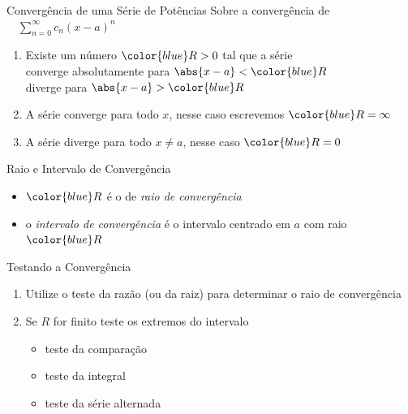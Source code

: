 \begin{frame}{Convergência de uma Série de Potências}
  Sobre a convergência de
  \(\quad\sum_{n=0}^\infty c_n(x-a)^n\quad\)

  \pause
  \vspace{\baselineskip}
  \begin{enumerate}[<+->]
    \item Existe um número ${\color{blue}R>0}$ tal que a série \\[1mm]
          \tabto{10mm} converge absolutamente para \tabto{70mm} \(\abs{x-a}<{\color{blue}R}\) \\
          \tabto{10mm} diverge para                \tabto{70mm} \(\abs{x-a}>{\color{blue}R}\)
    \vspace{\baselineskip}
    \item A série converge para todo $x$, nesse caso escrevemos ${\color{blue}R=\infty}$
    \vspace{\baselineskip}
    \item A série diverge para todo $x\neq a$, nesse caso ${\color{blue}R=0}$
  \end{enumerate}
\end{frame}

\begin{frame}{Raio e Intervalo de Convergência}
  \begin{itemize}[<+->]
  \item ${\color{blue}R}$ é o de \emph{raio de convergência} \\[\baselineskip]
  \item o \emph{intervalo de convergência} é o intervalo centrado em $a$ com raio ${\color{blue}R}$
  \end{itemize}

\end{frame}

\begin{frame}{Testando a Convergência}
\begin{enumerate}[<+->]
\item Utilize o teste da razão (ou da raiz) para determinar o raio de convergência
\vspace{\baselineskip}
\item Se $R$ for finito teste os extremos do intervalo
      \begin{itemize}
        \item teste da comparação
        \item teste da integral
        \item teste da série alternada
      \end{itemize}
\end{enumerate}
\end{frame}

